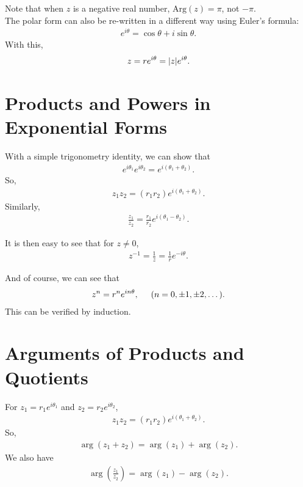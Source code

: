 \documentclass{book}
\theoremstyle{definition}
\newcommand{\Arg}{\text{Arg}}
\newcommand{\f}[2]{\frac{#1}{#2}}
\newcommand{\lp}{\left(}
\newcommand{\rp}{\right)}
\begin{document}
Note that when $z$ is a negative real number, $\Arg(z) = \pi$, not $-\pi$.\\

The polar form can also be re-written in a different way using Euler's formula:
\begin{align}
e^{i\theta} = \cos\theta + i\sin\theta.
\end{align}
With this,
\begin{align}
z = re^{i\theta} = \abs{z}e^{i\theta}.
\end{align}


\section{Products and Powers in Exponential Forms}

With a simple trigonometry identity, we can show that 
\begin{align}
e^{i\theta_1}e^{i\theta_2} = e^{i(\theta_1 + \theta_2)}.
\end{align}
So,
\begin{align}
z_1 z_2 = (r_1r_2)e^{i(\theta_1 + \theta_2)}.
\end{align}
Similarly,
\begin{align}
\f{z_1}{z_2} = \f{r_1}{r_2}e^{i(\theta_1 - \theta_2)}.
\end{align}

It is then easy to see that for $z\neq 0$,
\begin{align}
z^{-1} = \f{1}{z} = \f{1}{r}e^{-i\theta}.
\end{align}

And of course, we can see that 
\begin{align}
z^n = r^n e^{in\theta}, \hspace{0.5cm} (n=0,\pm 1,\pm 2,\dots).
\end{align}
This can be verified by induction. 


\section{Arguments of Products and Quotients}

For $z_1 = r_1 e^{i\theta_1}$ and $z_2 = r_2 e^{i\theta_2}$, 
\begin{align}
z_1z_2 = (r_1r_2)e^{i(\theta_1 + \theta_2)}.
\end{align}
So,
\begin{align}
\arg(z_1 + z_2) = \arg(z_1) + \arg(z_2).
\end{align}
We also have
\begin{align}
\arg\lp \f{z_1}{z_2} \rp = \arg(z_1) - \arg(z_2).
\end{align}
\end{document}
